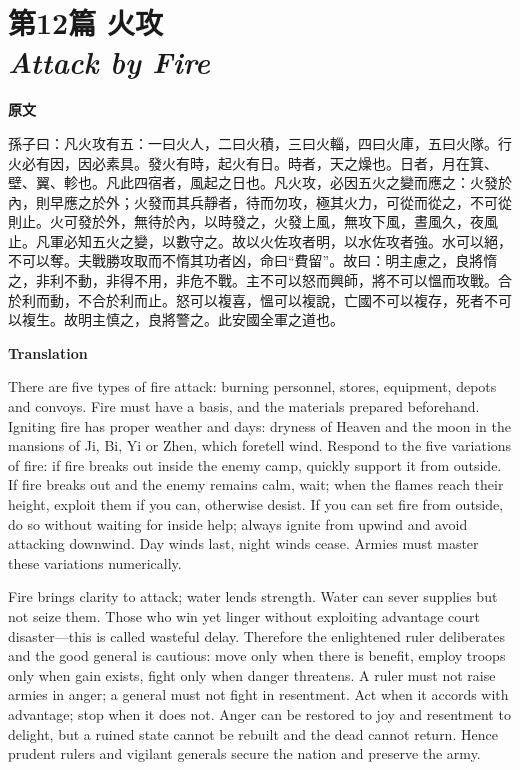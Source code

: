 \documentclass[12pt]{book}
\newcommand{\chapterentry}[4]{%
  \chapter[\texorpdfstring{#1}{#1}]{\texorpdfstring{#1\\\Large\textit{#2}}{#1 — #2}}%
  \noindent\textbf{原文}\par
  #3

  \bigskip
  \noindent\textbf{Translation}\par
  #4
}
\begin{document}
\chapterentry{第12篇 火攻}{Attack by Fire}{%
孫子曰：凡火攻有五：一曰火人，二曰火積，三曰火輜，四曰火庫，五曰火隊。行火必有因，因必素具。發火有時，起火有日。時者，天之燥也。日者，月在箕、壁、翼、軫也。凡此四宿者，風起之日也。凡火攻，必因五火之變而應之：火發於內，則早應之於外；火發而其兵靜者，待而勿攻，極其火力，可從而從之，不可從則止。火可發於外，無待於內，以時發之，火發上風，無攻下風，晝風久，夜風止。凡軍必知五火之變，以數守之。故以火佐攻者明，以水佐攻者強。水可以絕，不可以奪。夫戰勝攻取而不惰其功者凶，命曰“費留”。故曰：明主慮之，良將惰之，非利不動，非得不用，非危不戰。主不可以怒而興師，將不可以慍而攻戰。合於利而動，不合於利而止。怒可以複喜，慍可以複說，亡國不可以複存，死者不可以複生。故明主慎之，良將警之。此安國全軍之道也。}{%
There are five types of fire attack: burning personnel, stores, equipment, depots and convoys. Fire must have a basis, and the materials prepared beforehand. Igniting fire has proper weather and days: dryness of Heaven and the moon in the mansions of Ji, Bi, Yi or Zhen, which foretell wind. Respond to the five variations of fire: if fire breaks out inside the enemy camp, quickly support it from outside. If fire breaks out and the enemy remains calm, wait; when the flames reach their height, exploit them if you can, otherwise desist. If you can set fire from outside, do so without waiting for inside help; always ignite from upwind and avoid attacking downwind. Day winds last, night winds cease. Armies must master these variations numerically.

Fire brings clarity to attack; water lends strength. Water can sever supplies but not seize them. Those who win yet linger without exploiting advantage court disaster—this is called wasteful delay. Therefore the enlightened ruler deliberates and the good general is cautious: move only when there is benefit, employ troops only when gain exists, fight only when danger threatens. A ruler must not raise armies in anger; a general must not fight in resentment. Act when it accords with advantage; stop when it does not. Anger can be restored to joy and resentment to delight, but a ruined state cannot be rebuilt and the dead cannot return. Hence prudent rulers and vigilant generals secure the nation and preserve the army.}
\end{document}
